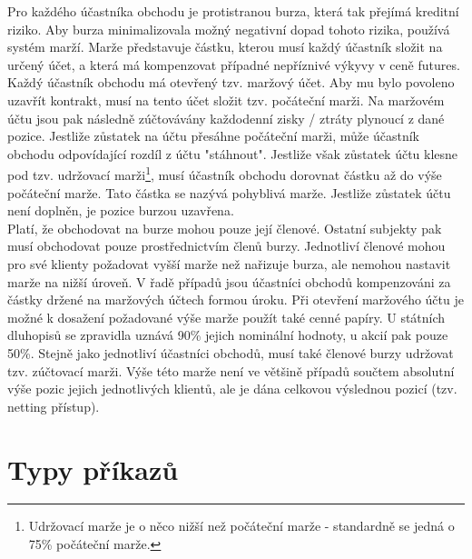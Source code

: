\documentclass[a4paper]{book}
\begin{document}
Pro každého účastníka obchodu je protistranou burza, která tak přejímá kreditní riziko. Aby burza minimalizovala možný negativní dopad tohoto rizika, používá systém marží. Marže představuje částku, kterou musí každý účastník složit na určený účet, a která má kompenzovat případné nepříznivé výkyvy v ceně futures.
Každý účastník obchodu má otevřený tzv. maržový účet. Aby mu bylo povoleno uzavřít kontrakt, musí na tento účet složit tzv. počáteční marži. Na maržovém účtu jsou pak následně zúčtovávány každodenní zisky / ztráty plynoucí z dané pozice.
Jestliže zůstatek na účtu přesáhne počáteční marži, může účastník obchodu odpovídající rozdíl z účtu "stáhnout". Jestliže však zůstatek účtu klesne pod tzv. udržovací marži\footnote{Udržovací marže je o něco nižší než počáteční marže - standardně se jedná o 75\% počáteční marže.}, musí účastník obchodu dorovnat částku až do výše počáteční marže. Tato částka se nazývá pohyblivá marže. Jestliže zůstatek účtu není doplněn, je pozice burzou uzavřena.\\
Platí, že obchodovat na burze mohou pouze její členové. Ostatní subjekty pak musí obchodovat pouze prostřednictvím členů burzy. Jednotliví členové mohou pro své klienty požadovat vyšší marže než nařizuje burza, ale nemohou nastavit marže na nižší úroveň. V řadě případů jsou účastníci obchodů kompenzováni za částky držené na maržových účtech formou úroku. Při otevření maržového účtu je možné k dosažení požadované výše marže použít také cenné papíry. U státních dluhopisů se zpravidla uznává 90\% jejich nominální hodnoty, u akcií pak pouze 50\%.
Stejně jako jednotliví účastníci obchodů, musí také členové burzy udržovat tzv. zúčtovací marži. Výše této marže není ve většině případů součtem absolutní výše pozic jejich jednotlivých klientů, ale je dána celkovou výslednou pozicí (tzv. netting přístup).

\section{Typy příkazů}
\end{document}

